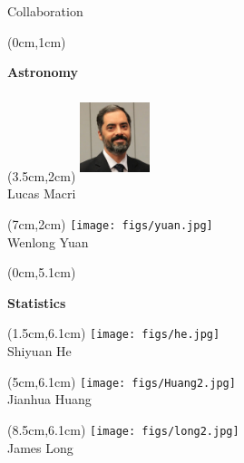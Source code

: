 \documentclass[12pt]{beamer}
\newcommand{\w}{0.8in}
\newcommand{\h}{1in}
\begin{document}
\begin{frame}{Collaboration}
  \begin{textblock*}{12cm}(0cm,1cm) %
\begin{center}
\textbf{Astronomy}
\end{center}
\end{textblock*}
  \begin{textblock*}{3cm}(3.5cm,2cm) %
\includegraphics[width=\w,height=\h]{figs/Macri.jpg}\\
Lucas Macri
\end{textblock*}
  \begin{textblock*}{3cm}(7cm,2cm) %
\texttt{[image: figs/yuan.jpg]}\\
Wenlong Yuan
\end{textblock*}


  \begin{textblock*}{12cm}(0cm,5.1cm) %
\begin{center}
\textbf{Statistics}
\end{center}
\end{textblock*}

  \begin{textblock*}{3cm}(1.5cm,6.1cm) %
\texttt{[image: figs/he.jpg]}\\
Shiyuan He
\end{textblock*}


  \begin{textblock*}{3cm}(5cm,6.1cm) %
\texttt{[image: figs/Huang2.jpg]}\\
Jianhua Huang
\end{textblock*}

  \begin{textblock*}{3cm}(8.5cm,6.1cm) %
\texttt{[image: figs/long2.jpg]}\\
James Long
\end{textblock*}
\end{frame}
\end{document}
